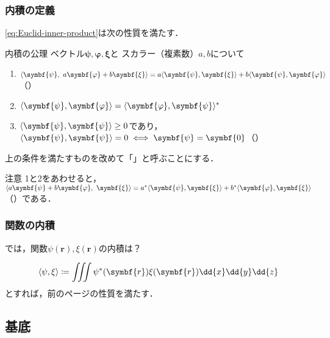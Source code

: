 \documentclass[
    10pt,
    ]{sotsu-beamer}
\begin{document}
\begin{frame}
    \frametitle{内積の定義}

    \eqref{eq:Euclid-inner-product}は次の性質を満たす．

    \begin{block}{内積の公理}
        ベクトル$\symbf{\psi}, \symbf{\varphi}, \symbf{\xi}$と
        スカラー（複素数）$a, b$について
        \begin{enumerate}
            \item $\iparen{\symbf{\psi}, \  a\symbf{\varphi} + b\symbf{\xi}} = a\iparen{\symbf{\psi}, \symbf{\xi}} + b\iparen{\symbf{\psi}, \symbf{\varphi}}$（）
            \item $\iparen{\symbf{\psi}, \symbf{\varphi}} = \conj{\iparen{\symbf{\varphi}, \symbf{\psi}}}$
            \item $\iparen{\symbf{\psi}, \symbf{\psi}} \geq 0$であり，
                $\iparen{\symbf{\psi}, \symbf{\psi}} = 0 \iff \symbf{\psi} = \symbf{0}$（）
        \end{enumerate}
    \end{block}

    上の条件を満たすものを改めて「」と呼ぶことにする．

    \pause

    \begin{alertblock}{注意}
        1と2をあわせると，
        $\iparen{a\symbf{\psi} + b\symbf{\varphi}, \  \symbf{\xi}} = \conj{a}\iparen{\symbf{\psi}, \symbf{\xi}} + \conj{b}\iparen{\symbf{\varphi}, \symbf{\xi}}$（）である．
    \end{alertblock}


\end{frame}

\begin{frame}
    \frametitle{関数の内積}

    では，関数$\psi(\symbf{r}), \xi(\symbf{r})$の内積は？

    \pause

    \begin{equation}
        \iparen{\psi, \xi}
            \coloneq \iiint \conj{\psi}(\symbf{r}) \xi(\symbf{r}) \dd{x} \dd{y} \dd{z}
    \end{equation}
    とすれば，前のページの性質を満たす．

\end{frame}


\subsection{基底}
\end{document}
